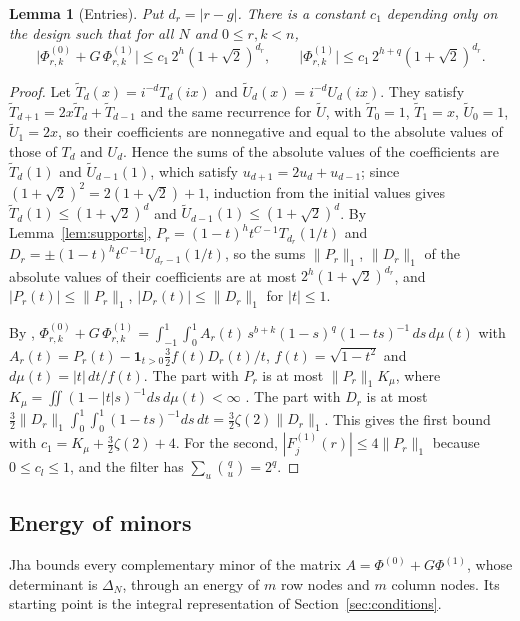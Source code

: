 \documentclass[11pt]{article}
\newtheorem{lemma}[theorem]{Lemma}
\theoremstyle{definition}
\begin{document}
\begin{lemma}[Entries]\label{xlem:entries}
Put $d_r=|r-g|$. There is a constant $c_1$ depending only on the design such that for all $N$ and $0\le r,k<n$,
\[
\big|\Phi^{(0)}_{r,k}+G\,\Phi^{(1)}_{r,k}\big|\le c_1\,2^h(1+\sqrt2)^{d_r},\qquad \big|\Phi^{(1)}_{r,k}\big|\le c_1\,2^{h+q}(1+\sqrt2)^{d_r}.
\]
\end{lemma}

\begin{proof}
Let $\tilde T_d(x)=i^{-d}T_d(ix)$ and $\tilde U_d(x)=i^{-d}U_d(ix)$. They satisfy $\tilde T_{d+1}=2x\tilde T_d+\tilde T_{d-1}$ and the same recurrence for $\tilde U$, with $\tilde T_0=1$, $\tilde T_1=x$, $\tilde U_0=1$, $\tilde U_1=2x$, so their coefficients are nonnegative and equal to the absolute values of those of $T_d$ and $U_d$. Hence the sums of the absolute values of the coefficients are $\tilde T_d(1)$ and $\tilde U_{d-1}(1)$, which satisfy $u_{d+1}=2u_d+u_{d-1}$; since $(1+\sqrt2)^2=2(1+\sqrt2)+1$, induction from the initial values gives $\tilde T_d(1)\le(1+\sqrt2)^d$ and $\tilde U_{d-1}(1)\le(1+\sqrt2)^d$. By Lemma~\ref{lem:supports}, $P_r=(1-t)^ht^{C-1}T_{d_r}(1/t)$ and $D_r=\pm(1-t)^ht^{C-1}U_{d_r-1}(1/t)$, so the sums $\|P_r\|_1$, $\|D_r\|_1$ of the absolute values of their coefficients are at most $2^h(1+\sqrt2)^{d_r}$, and $|P_r(t)|\le\|P_r\|_1$, $|D_r(t)|\le\|D_r\|_1$ for $|t|\le1$.

By \cite[Sec.~5.1]{OAI}, $\Phi^{(0)}_{r,k}+G\,\Phi^{(1)}_{r,k}=\int_{-1}^1\int_0^1A_r(t)\,s^{b+k}(1-s)^q(1-ts)^{-1}\,ds\,d\mu(t)$ with $A_r(t)=P_r(t)-\mathbf 1_{t>0}\frac32f(t)D_r(t)/t$, $f(t)=\sqrt{1-t^2}$ and $d\mu(t)=|t|\,dt/f(t)$. The part with $P_r$ is at most $\|P_r\|_1K_\mu$, where $K_\mu=\iint(1-|t|s)^{-1}ds\,d\mu(t)<\infty$ \cite[Sec.~5.1]{OAI}. The part with $D_r$ is at most $\frac32\|D_r\|_1\int_0^1\int_0^1(1-ts)^{-1}ds\,dt=\frac32\zeta(2)\|D_r\|_1$. This gives the first bound with $c_1=K_\mu+\frac32\zeta(2)+4$. For the second, $|F^{(1)}_j(r)|\le4\|P_r\|_1$ because $0\le c_l\le1$, and the filter has $\sum_u\binom qu=2^q$.
\end{proof}

\subsection{Energy of minors}\label{xsec:minors}

Jha \cite[Sections~5--6]{Jha} bounds every complementary minor of the matrix $A=\Phi^{(0)}+G\Phi^{(1)}$, whose determinant is $\Delta_N$, through an energy of $m$ row nodes and $m$ column nodes. Its starting point is the integral representation of Section~\ref{sec:conditions}.
\end{document}
